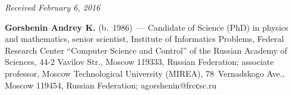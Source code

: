 \vspace*{-3pt}

\hfill{\small\textit{Received February 6, 2016}}

\Contrl


\noindent
\textbf{Gorshenin Andrey K.}  (b.\ 1986)~---
Candidate of Science (PhD) in physics and mathematics, senior scientist, 
Institute of Informatics Problems, Federal Research Center ``Computer Science and Control'' 
of the Russian Academy of Sciences, 44-2 Vavilov Str., Moscow 119333, 
Russian Federation; associate professor, %
Moscow Technological University (MIREA), 
78~Vernadskogo Ave., Moscow 119454, Russian Federation;
 agorshenin@frcсsc.ru
 




\label{end\stat}


\renewcommand{\bibname}{\protect\rm Литература}
